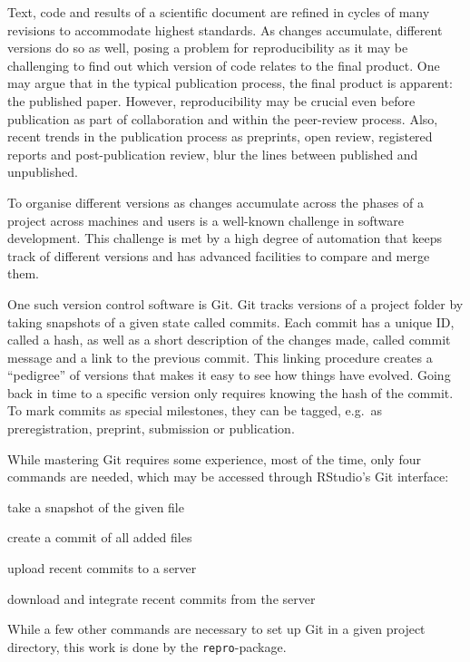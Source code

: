 \documentclass[12pt,a4paper,twoside]{article}
\providecommand{\tightlist}{%
  \setlength{\itemsep}{0pt}\setlength{\parskip}{0pt}}
\begin{document}
Text, code and results of a scientific document are refined in cycles of many revisions to accommodate highest standards.
As changes accumulate, different versions do so as well, posing a problem for reproducibility as it may be challenging to find out which version of code relates to the final product.
One may argue that in the typical publication process, the final product is apparent: the published paper.
However, reproducibility may be crucial even before publication as part of collaboration and within the peer-review process.
Also, recent trends in the publication process as preprints, open review, registered reports and post-publication review, blur the lines between published and unpublished.

To organise different versions as changes accumulate across the phases of a project across machines and users is a well-known challenge in software development.
This challenge is met by a high degree of automation that keeps track of different versions and has advanced facilities to compare and merge them.

One such version control software is Git. Git tracks versions of a project folder by taking snapshots of a given state called commits.
Each commit has a unique ID, called a hash, as well as a short description of the changes made, called commit message and a link to the previous commit.
This linking procedure creates a ``pedigree'' of versions that makes it easy to see how things have evolved.
Going back in time to a specific version only requires knowing the hash of the commit.
To mark commits as special milestones, they can be tagged, e.g.~as preregistration, preprint, submission or publication.

While mastering Git requires some experience, most of the time, only four commands are needed, which may be accessed through RStudio's Git interface:

\begin{description}
\tightlist
\item[git add]
take a snapshot of the given file
\item[git commit]
create a commit of all added files
\item[git push]
upload recent commits to a server
\item[git pull]
download and integrate recent commits from the server
\end{description}

While a few other commands are necessary to set up Git in a given project directory, this work is done by the \texttt{repro}-package.
\end{document}
